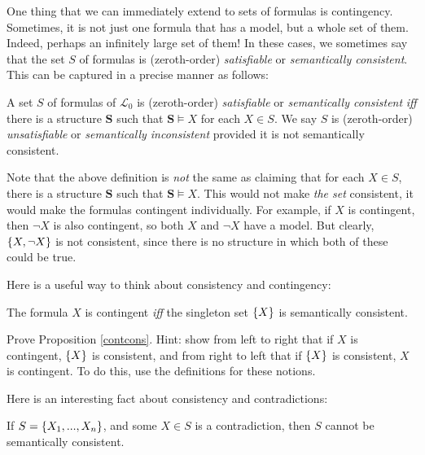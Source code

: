 One thing that we can immediately extend to sets of formulas is contingency. Sometimes, it is not just one formula that has a model, but a whole set of them. Indeed, perhaps an infinitely large set of them! In these cases, we sometimes say that the set $S$ of formulas is (zeroth-order) \textit{satisfiable} or \textit{semantically consistent}. This can be captured in a precise manner as follows:

\begin{defn}
A set $S$ of formulas of $\mathcal{L}_0$ is (zeroth-order) \textit{satisfiable} or \textit{semantically consistent} \textit{iff} there is a structure $\mathbf{S}$ such that $\mathbf{S} \models X$ for each $X \in S$. We say $S$ is (zeroth-order) \textit{unsatisfiable} or \textit{semantically inconsistent} provided it is not semantically consistent. 
\end{defn}

\begin{remark}
Note that the above definition is \textit{not} the same as claiming that for each $X \in S$, there is a structure $\mathbf{S}$ such that $\mathbf{S} \models X$. This would not make \textit{the set} consistent, it would make the formulas contingent individually. For example, if $X$ is contingent, then $\neg X$ is also contingent, so both $X$ and $\neg X$ have a model. But clearly, $\{X, \neg X\}$ is not consistent, since there is no structure in which both of these could be true.  
\end{remark}

Here is a useful way to think about consistency and contingency:

\begin{prop}
The formula $X$ is contingent \textit{iff} the singleton set $\{X\}$ is semantically consistent. \label{contcons}
\end{prop}

\begin{exc}
Prove Proposition \ref{contcons}. Hint: show from left to right that if $X$ is contingent, $\{X\}$ is consistent, and from right to left that if $\{X\}$ is consistent, $X$ is contingent. To do this, use the definitions for these notions. 
\end{exc}

Here is an interesting fact about consistency and contradictions:

\begin{prop}
If $S=\{X_1, ..., X_n\}$, and some $X \in S$ is a contradiction, then $S$ cannot be semantically consistent. 
\end{prop}


